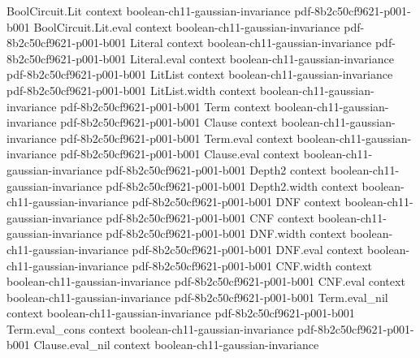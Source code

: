 \begin{theorem}
\label{BooleanAnalysis.GaussianSpace.relaxedGaussianSurfaceArea_eq}
\leanok
{}
\proofstep
  {BoolCircuit.Lit}
  {context}
  {boolean-ch11-gaussian-invariance}
  {pdf-8b2c50cf9621-p001-b001}
\proofstep
  {BoolCircuit.Lit.eval}
  {context}
  {boolean-ch11-gaussian-invariance}
  {pdf-8b2c50cf9621-p001-b001}
\proofstep
  {Literal}
  {context}
  {boolean-ch11-gaussian-invariance}
  {pdf-8b2c50cf9621-p001-b001}
\proofstep
  {Literal.eval}
  {context}
  {boolean-ch11-gaussian-invariance}
  {pdf-8b2c50cf9621-p001-b001}
\proofstep
  {LitList}
  {context}
  {boolean-ch11-gaussian-invariance}
  {pdf-8b2c50cf9621-p001-b001}
\proofstep
  {LitList.width}
  {context}
  {boolean-ch11-gaussian-invariance}
  {pdf-8b2c50cf9621-p001-b001}
\proofstep
  {Term}
  {context}
  {boolean-ch11-gaussian-invariance}
  {pdf-8b2c50cf9621-p001-b001}
\proofstep
  {Clause}
  {context}
  {boolean-ch11-gaussian-invariance}
  {pdf-8b2c50cf9621-p001-b001}
\proofstep
  {Term.eval}
  {context}
  {boolean-ch11-gaussian-invariance}
  {pdf-8b2c50cf9621-p001-b001}
\proofstep
  {Clause.eval}
  {context}
  {boolean-ch11-gaussian-invariance}
  {pdf-8b2c50cf9621-p001-b001}
\proofstep
  {Depth2}
  {context}
  {boolean-ch11-gaussian-invariance}
  {pdf-8b2c50cf9621-p001-b001}
\proofstep
  {Depth2.width}
  {context}
  {boolean-ch11-gaussian-invariance}
  {pdf-8b2c50cf9621-p001-b001}
\proofstep
  {DNF}
  {context}
  {boolean-ch11-gaussian-invariance}
  {pdf-8b2c50cf9621-p001-b001}
\proofstep
  {CNF}
  {context}
  {boolean-ch11-gaussian-invariance}
  {pdf-8b2c50cf9621-p001-b001}
\proofstep
  {DNF.width}
  {context}
  {boolean-ch11-gaussian-invariance}
  {pdf-8b2c50cf9621-p001-b001}
\proofstep
  {DNF.eval}
  {context}
  {boolean-ch11-gaussian-invariance}
  {pdf-8b2c50cf9621-p001-b001}
\proofstep
  {CNF.width}
  {context}
  {boolean-ch11-gaussian-invariance}
  {pdf-8b2c50cf9621-p001-b001}
\proofstep
  {CNF.eval}
  {context}
  {boolean-ch11-gaussian-invariance}
  {pdf-8b2c50cf9621-p001-b001}
\proofstep
  {Term.eval_nil}
  {context}
  {boolean-ch11-gaussian-invariance}
  {pdf-8b2c50cf9621-p001-b001}
\proofstep
  {Term.eval_cons}
  {context}
  {boolean-ch11-gaussian-invariance}
  {pdf-8b2c50cf9621-p001-b001}
\proofstep
  {Clause.eval_nil}
  {context}
  {boolean-ch11-gaussian-invariance}

\end{theorem}
